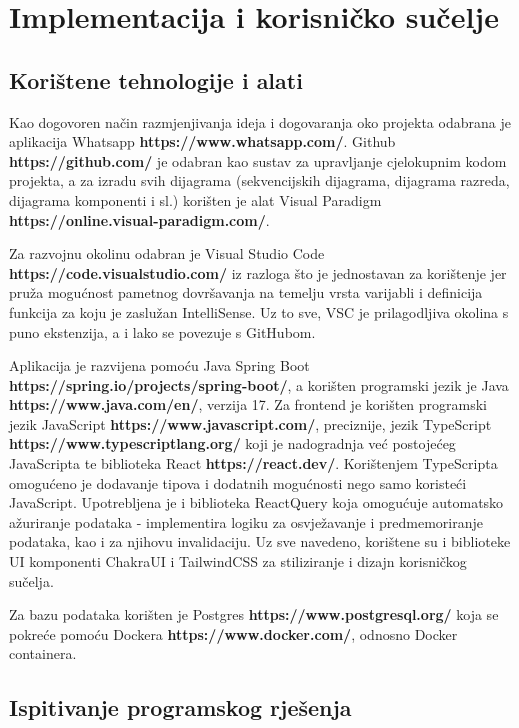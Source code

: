 \chapter{Implementacija i korisničko sučelje}
		
		
		\section{Korištene tehnologije i alati}
		
			Kao dogovoren način razmjenjivanja ideja i dogovaranja oko projekta odabrana je 
			aplikacija Whatsapp \textbf{https://www.whatsapp.com/}. Github \textbf{https://github.com/}
			je odabran kao sustav za upravljanje cjelokupnim kodom projekta, a za izradu 
			svih dijagrama (sekvencijskih dijagrama, dijagrama razreda, dijagrama komponenti i sl.) 
			korišten je alat Visual Paradigm \textbf{https://online.visual-paradigm.com/}.
			
			Za razvojnu okolinu odabran je Visual Studio Code \textbf{https://code.visualstudio.com/}
			iz razloga što je jednostavan za korištenje jer pruža mogućnost pametnog dovršavanja
			na temelju vrsta varijabli i definicija funkcija za koju je zaslužan IntelliSense.
			Uz to sve, VSC je prilagodljiva okolina s puno ekstenzija, a i lako se povezuje 
			s GitHubom.
			
			Aplikacija je razvijena pomoću Java Spring Boot \textbf{https://spring.io/projects/spring-boot/},
			a korišten programski jezik je Java \textbf{https://www.java.com/en/}, verzija 17. 
			Za frontend je korišten programski jezik JavaScript \textbf{https://www.javascript.com/}, preciznije, 
			jezik TypeScript \textbf{https://www.typescriptlang.org/} koji je nadogradnja već
			postojećeg JavaScripta te biblioteka React \textbf{https://react.dev/}.
			Korištenjem TypeScripta omogućeno je dodavanje tipova i dodatnih mogućnosti nego samo
			koristeći JavaScript. Upotrebljena je i biblioteka ReactQuery koja omogućuje
			automatsko ažuriranje podataka - implementira logiku za osvježavanje i predmemoriranje 
			podataka, kao i za njihovu invalidaciju. Uz sve navedeno, korištene su i
			biblioteke UI komponenti ChakraUI i TailwindCSS za stiliziranje i dizajn korisničkog sučelja.
			
			Za bazu podataka korišten je Postgres \textbf{https://www.postgresql.org/} koja se 
			pokreće pomoću Dockera \textbf{https://www.docker.com/}, odnosno Docker containera.
			
			
			\eject 
		
	
		\section{Ispitivanje programskog rješenja}
			
